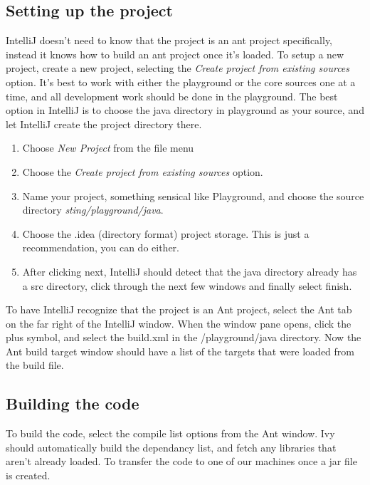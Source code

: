 \documentclass[11pt,fullpage]{article}
\begin{document}
\subsection{Setting up the project}
IntelliJ doesn't need to know that the project is an ant project specifically, instead it knows how to build an ant project once it's loaded.  To
setup a new project, create a new project, selecting the \textit{Create project from existing sources} option.  It's best to work with either the 
playground or the core sources one at a time, and all development work should be done in the playground.  The best option in IntelliJ is to 
choose the java directory in playground as your source, and let IntelliJ create the project directory there. 
\\
\begin{enumerate}
\item Choose \textit{New Project} from the file menu \\
\item Choose the \textit{Create project from existing sources} option.\\
\item Name your project, something sensical like Playground, and choose the source directory \textit{sting/playground/java}. \\
\item Choose the .idea (directory format) project storage.  This is just a recommendation, you can do either. \\
\item After clicking next, IntelliJ should detect that the java directory already has a src directory, click through the next few windows and finally select finish.
\end{enumerate}

To have IntelliJ recognize that the project is an Ant project, select the Ant tab on the far right of the IntelliJ window.  When the window pane opens, click the
plus symbol, and select the build.xml in the /playground/java directory.  Now the Ant build target window should have a list of the targets that were loaded
from the build file.

\subsection{Building the code}
To build the code, select the compile list options from the Ant window.  Ivy should automatically build the dependancy list, and fetch any libraries that aren't already loaded.  To 
transfer the code to one of our machines once a jar file is created.  
\end{document}
